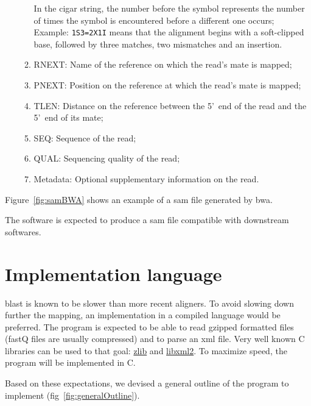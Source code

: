 \begin{itemize}
\begin{enumerate}
        In the \gls{cigar} string, the number before the symbol represents the number of times the symbol is encountered before a different one occurs;
        Example: \texttt{1S3=2X1I} means that the alignment begins with a soft-clipped base, followed by three matches, two mismatches and an insertion.
        \item RNEXT\@: Name of the reference on which the read's mate is mapped;
        \item PNEXT\@: Position on the reference at which the read's mate is mapped;
        \item TLEN\@: Distance on the reference between the 5'~end of the read and the 5'~end of its mate;
        \item SEQ\@: Sequence of the read;
        \item QUAL\@: Sequencing quality of the read;
        \item Metadata: Optional supplementary information on the read.
    \end{enumerate}   
\end{itemize}

Figure~\ref{fig:samBWA} shows an example of a \gls{sam} file generated by \gls{bwa}.

The software is expected to produce a \gls{sam} file compatible with downstream softwares.


\section{Implementation language}
\gls{blast} is known to be slower than more recent aligners.
To avoid slowing down further the mapping, an implementation in a compiled language would be preferred.
The program is expected to be able to read gzipped formatted files (fastQ files are usually compressed) and to parse an \gls{xml} file.
Very well known C libraries can be used to that goal: \href{http://www.zlib.net/}{zlib} and \href{http://www.xmlsoft.org/}{libxml2}.
To maximize speed, the program will be implemented in C.

Based on these expectations, we devised a general outline of the program to implement (fig~\ref{fig:generalOutline}).

